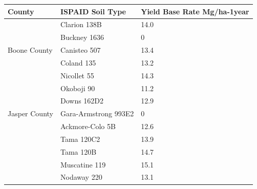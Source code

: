 \documentclass[11pt]{article}
\begin{document}
\begin{table}[!h]
\centering
\begin{tabular}{|l|l|l|l|l|l|}
\hline
\multicolumn{2}{|l|}{County}                  & \multicolumn{2}{|l|}{ISPAID Soil Type} & \multicolumn{2}{|l|}{Yield Base Rate Mg/ha-1year} \\ 
\hline
\multicolumn{2}{|l|}{\multirow{5}{*}{Boone County}} & \multicolumn{2}{|l|}{Clarion 138B} & \multicolumn{2}{|l|}{14.0} \\ 
\cline{3-6} 
\multicolumn{2}{|l|}{}                  & \multicolumn{2}{|l|}{Buckney 1636} & \multicolumn{2}{|l|}{0} \\ 
\cline{3-6} 
\multicolumn{2}{|l|}{}                  & \multicolumn{2}{|l|}{Canisteo 507} & \multicolumn{2}{|l|}{13.4} \\ 
\cline{3-6} 
\multicolumn{2}{|l|}{}                  & \multicolumn{2}{|l|}{Coland 135} & \multicolumn{2}{|l|}{13.2} \\ 
\cline{3-6} 
\multicolumn{2}{|l|}{}                  & \multicolumn{2}{|l|}{Nicollet 55} & \multicolumn{2}{|l|}{14.3} \\ 
\cline{3-6}
\multicolumn{2}{|l|}{}                  & \multicolumn{2}{|l|}{Okoboji 90} & \multicolumn{2}{|l|}{11.2} \\ 
\hline
\multicolumn{2}{|l|}{\multirow{3}{*}{Jasper County}} & \multicolumn{2}{|l|}{Downs 162D2} & \multicolumn{2}{|l|}{12.9} \\ 
\cline{3-6} 
\multicolumn{2}{|l|}{}                  & \multicolumn{2}{|l|}{Gara-Armstrong 993E2} & \multicolumn{2}{|l|}{0} \\ 
\cline{3-6} 
\multicolumn{2}{|l|}{}                  & \multicolumn{2}{|l|}{Ackmore-Colo 5B} & \multicolumn{2}{|l|}{12.6} \\ 
\cline{3-6} 
\multicolumn{2}{|l|}{}                  & \multicolumn{2}{|l|}{Tama 120C2} & \multicolumn{2}{|l|}{13.9} \\ 
\cline{3-6} 
\multicolumn{2}{|l|}{}                  & \multicolumn{2}{|l|}{Tama 120B} & \multicolumn{2}{|l|}{14.7} \\ 
\cline{3-6} 
\multicolumn{2}{|l|}{}                  & \multicolumn{2}{|l|}{Muscatine 119} & \multicolumn{2}{|l|}{15.1} \\ 
\cline{3-6} 
\multicolumn{2}{|l|}{}                  & \multicolumn{2}{|l|}{Nodaway 220} & \multicolumn{2}{|l|}{13.1} \\ 
\hline
\end{tabular}
\end{table}
\end{document}
